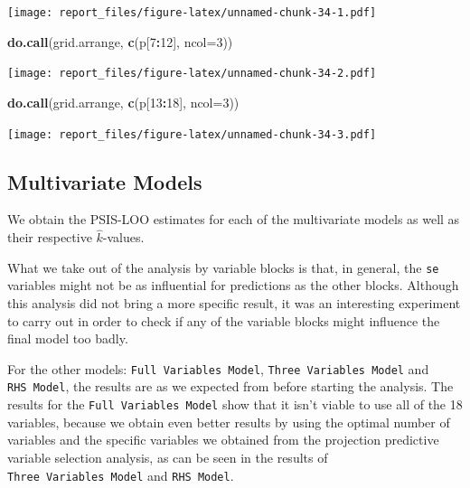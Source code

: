 \documentclass[
]{article}
\newenvironment{Shaded}{\begin{snugshade}}{\end{snugshade}}
\newcommand{\DataTypeTok}[1]{\textcolor[rgb]{0.13,0.29,0.53}{#1}}
\newcommand{\DecValTok}[1]{\textcolor[rgb]{0.00,0.00,0.81}{#1}}
\newcommand{\KeywordTok}[1]{\textcolor[rgb]{0.13,0.29,0.53}{\textbf{#1}}}
\newcommand{\NormalTok}[1]{#1}
\newcommand{\OperatorTok}[1]{\textcolor[rgb]{0.81,0.36,0.00}{\textbf{#1}}}
\begin{document}
\texttt{[image: report\_files/figure-latex/unnamed-chunk-34-1.pdf]}

\begin{Shaded}
\begin{Highlighting}[]
\KeywordTok{do.call}\NormalTok{(grid.arrange, }\KeywordTok{c}\NormalTok{(p[}\DecValTok{7}\OperatorTok{:}\DecValTok{12}\NormalTok{], }\DataTypeTok{ncol=}\DecValTok{3}\NormalTok{))}
\end{Highlighting}
\end{Shaded}

\texttt{[image: report\_files/figure-latex/unnamed-chunk-34-2.pdf]}

\begin{Shaded}
\begin{Highlighting}[]
\KeywordTok{do.call}\NormalTok{(grid.arrange, }\KeywordTok{c}\NormalTok{(p[}\DecValTok{13}\OperatorTok{:}\DecValTok{18}\NormalTok{], }\DataTypeTok{ncol=}\DecValTok{3}\NormalTok{))}
\end{Highlighting}
\end{Shaded}

\texttt{[image: report\_files/figure-latex/unnamed-chunk-34-3.pdf]}

\hypertarget{multivariate-models-1}{%
\subsection{Multivariate Models}\label{multivariate-models-1}}

We obtain the PSIS-LOO estimates for each of the multivariate models as
well as their respective \(\hat{k}\)-values.

What we take out of the analysis by variable blocks is that, in general,
the \texttt{se} variables might not be as influential for predictions as
the other blocks. Although this analysis did not bring a more specific
result, it was an interesting experiment to carry out in order to check
if any of the variable blocks might influence the final model too badly.

For the other models: \texttt{Full\ Variables\ Model},
\texttt{Three\ Variables\ Model} and \texttt{RHS\ Model}, the results
are as we expected from before starting the analysis. The results for
the \texttt{Full\ Variables\ Model} show that it isn't viable to use all
of the 18 variables, because we obtain even better results by using the
optimal number of variables and the specific variables we obtained from
the projection predictive variable selection analysis, as can be seen in
the results of \texttt{Three\ Variables\ Model} and \texttt{RHS\ Model}.
\end{document}
